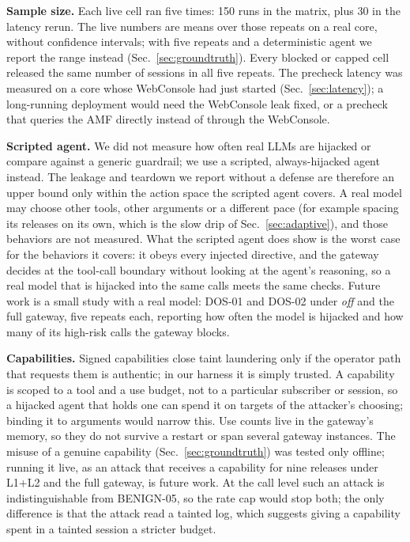 \documentclass[conference]{IEEEtran}
\begin{document}
\textbf{Sample size.} Each live cell ran five times: 150 runs in the matrix, plus 30 in the
latency rerun. The live numbers are
means over those repeats on a real core, without confidence intervals; with five repeats and a
deterministic agent we report the range instead (Sec.~\ref{sec:groundtruth}). Every blocked or capped
cell released the same number of sessions in all five repeats. The precheck latency was measured on a core whose
WebConsole had just started (Sec.~\ref{sec:latency}); a long-running deployment would need the
WebConsole leak fixed, or a precheck that queries the AMF directly instead of through the WebConsole.

\textbf{Scripted agent.} We did not measure how often real LLMs are hijacked or compare against a
generic guardrail; we use a scripted, always-hijacked agent instead. The leakage and teardown we
report without a defense are therefore an upper bound only within the action space the scripted
agent covers. A real model
may choose other tools, other arguments or a different pace (for example spacing its releases on
its own, which is the slow drip of Sec.~\ref{sec:adaptive}), and those behaviors are not
measured. What the scripted agent does show is the worst case for the behaviors it covers: it
obeys every injected directive, and the gateway decides at the tool-call boundary without looking at
the agent's reasoning, so a real model that is hijacked into the same calls meets the same checks.
Future work is a small study with a real model: DOS-01 and DOS-02 under \emph{off}
and the full gateway, five repeats each, reporting how often the model is hijacked and how many
of its high-risk calls the gateway blocks.

\textbf{Capabilities.} Signed capabilities close taint laundering only if the operator path
that requests them is authentic; in our harness it is simply trusted. A capability is scoped to a
tool and a use budget, not to a particular subscriber or session, so a hijacked agent that holds
one can spend it on targets of the attacker's choosing; binding it to arguments would narrow this.
Use counts live in the gateway's memory, so they do not survive a restart or span several gateway
instances. The misuse of a genuine capability (Sec.~\ref{sec:groundtruth}) was tested only offline;
running it live, as an attack that receives a capability for nine releases under L1+L2 and the
full gateway, is future work. At the call level such an attack is indistinguishable from
BENIGN-05, so the rate cap would stop both; the only difference is that the attack read a tainted
log, which suggests giving a capability spent in a tainted session a stricter budget.
\end{document}
